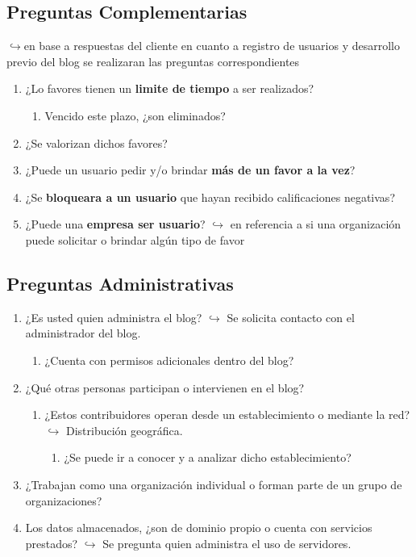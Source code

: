 \documentclass[a4paper,10pt]{article}
\begin{document}
\subsection{Preguntas Complementarias}
$\hookrightarrow{}$en base a respuestas del cliente en cuanto a registro de usuarios y desarrollo previo del blog se realizaran las preguntas correspondientes
\begin{enumerate}
    \item ¿Lo favores tienen un \textbf{limite de tiempo} a ser realizados?
    \begin{enumerate}
        \item Vencido este plazo, ¿son eliminados?
    \end{enumerate}
    \item ¿Se valorizan dichos favores? 
    \item ¿Puede un usuario pedir y/o brindar \textbf{más de un favor a la vez}?
    \item ¿Se \textbf{bloqueara a un usuario} que hayan recibido calificaciones negativas?
    \item ¿Puede una \textbf{empresa ser usuario}?
    \subitem $\hookrightarrow{}$ en referencia a si una organización puede solicitar o brindar algún tipo de favor
\end{enumerate}


\subsection{Preguntas Administrativas}
\begin{enumerate}
    \item ¿Es usted quien administra el blog?
    \subitem $\hookrightarrow{}$ Se solicita contacto con el administrador del blog.
    \begin{enumerate}
        \item ¿Cuenta con permisos adicionales dentro del blog?
    \end{enumerate}
    \item ¿Qué otras personas participan o intervienen en el blog?
    \begin{enumerate}
        \item ¿Estos contribuidores operan desde un establecimiento o mediante la red?
        \subitem $\hookrightarrow{}$ Distribución geográfica.
        \begin{enumerate}
            \item ¿Se puede ir a conocer y a analizar dicho establecimiento?
        \end{enumerate}
    \end{enumerate}
    \item ¿Trabajan como una organización individual o forman parte de un grupo de organizaciones?
    \item Los datos almacenados, ¿son de dominio propio o cuenta con servicios prestados?
    \subitem $\hookrightarrow{}$ Se pregunta quien administra el uso de servidores.
\end{enumerate}
\end{document}
